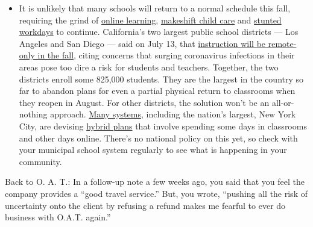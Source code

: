 \begin{itemize}
  \begin{itemize}
  \tightlist
  \item
    It is unlikely that many schools will return to a normal schedule
    this fall, requiring the grind of
    \href{https://www.nytimes.com/2020/06/05/us/coronavirus-education-lost-learning.html?action=click\&pgtype=Article\&state=default\&region=MAIN_CONTENT_3\&context=storylines_faq}{online
    learning},
    \href{https://www.nytimes.com/2020/05/29/us/coronavirus-child-care-centers.html?action=click\&pgtype=Article\&state=default\&region=MAIN_CONTENT_3\&context=storylines_faq}{makeshift
    child care} and
    \href{https://www.nytimes.com/2020/06/03/business/economy/coronavirus-working-women.html?action=click\&pgtype=Article\&state=default\&region=MAIN_CONTENT_3\&context=storylines_faq}{stunted
    workdays} to continue. California's two largest public school
    districts --- Los Angeles and San Diego --- said on July 13, that
    \href{https://www.nytimes.com/2020/07/13/us/lausd-san-diego-school-reopening.html?action=click\&pgtype=Article\&state=default\&region=MAIN_CONTENT_3\&context=storylines_faq}{instruction
    will be remote-only in the fall}, citing concerns that surging
    coronavirus infections in their areas pose too dire a risk for
    students and teachers. Together, the two districts enroll some
    825,000 students. They are the largest in the country so far to
    abandon plans for even a partial physical return to classrooms when
    they reopen in August. For other districts, the solution won't be an
    all-or-nothing approach.
    \href{https://bioethics.jhu.edu/research-and-outreach/projects/eschool-initiative/school-policy-tracker/}{Many
    systems}, including the nation's largest, New York City, are
    devising
    \href{https://www.nytimes.com/2020/06/26/us/coronavirus-schools-reopen-fall.html?action=click\&pgtype=Article\&state=default\&region=MAIN_CONTENT_3\&context=storylines_faq}{hybrid
    plans} that involve spending some days in classrooms and other days
    online. There's no national policy on this yet, so check with your
    municipal school system regularly to see what is happening in your
    community.
  \end{itemize}
\end{itemize}

Back to O. A. T.: In a follow-up note a few weeks ago, you said that you
feel the company provides a ``good travel service.'' But, you wrote,
``pushing all the risk of uncertainty onto the client by refusing a
refund makes me fearful to ever do business with O.A.T. again.''


